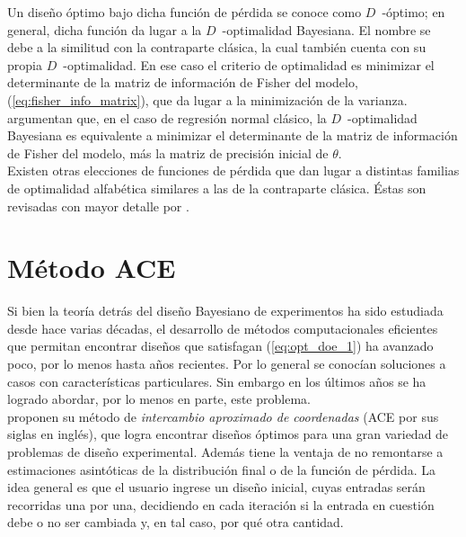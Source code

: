 Un diseño óptimo bajo dicha función de pérdida se conoce como $D$~-óptimo; en general, dicha función da lugar a la $D$~-optimalidad Bayesiana. El nombre se debe a la similitud con la contraparte clásica, la cual también cuenta con su propia $D$~-optimalidad. En ese caso el criterio de optimalidad es minimizar el determinante de la matriz de información de Fisher del modelo, (\ref{eq:fisher_info_matrix}), que da lugar a la minimización de la varianza. \citet{chaloner_verdinelli_doe} argumentan que, en el caso de regresión normal clásico, la $D$~-optimalidad Bayesiana es equivalente a minimizar el determinante de la matriz de información de Fisher del modelo, más la matriz de precisión inicial de $\theta$. \\


Existen otras elecciones de funciones de pérdida que dan lugar a distintas familias de optimalidad 	alfabética similares a las de la contraparte clásica. Éstas son revisadas con mayor detalle por \cite[Capítulo 2.3]{chaloner_verdinelli_doe}.






\section{Método ACE}


Si bien la teoría detrás del diseño Bayesiano de experimentos ha sido estudiada desde hace varias décadas, el desarrollo de métodos computacionales eficientes que permitan encontrar diseños que satisfagan (\ref{eq:opt_doe_1}) ha avanzado poco, por lo menos hasta años recientes. Por lo general se conocían soluciones a casos con características particulares. Sin embargo en los últimos años se ha logrado abordar, por lo menos en parte, este problema. \\



\cite{Woods_ACE} proponen su método de \textit{intercambio aproximado de coordenadas} (ACE por sus siglas en inglés), que logra encontrar diseños óptimos para una gran variedad de problemas de diseño experimental. Además tiene la ventaja de no remontarse a estimaciones asintóticas de la distribución final o de la función de pérdida. La idea general es que el usuario ingrese un diseño inicial, cuyas entradas serán recorridas una por una, decidiendo en cada iteración si la entrada en cuestión debe o no ser cambiada y, en tal caso, por qué otra cantidad. \\


